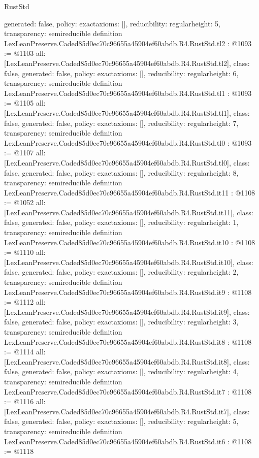 \begin{lexlean}{RustStd}
\begin{coremodule}
{  generated: false,
  policy: exact{axioms: []},
  reducibility: regular{height: 5},
  transparency: semireducible
}
definition LexLeanPreserve.Caded85d0ec70c96655a45904ef60abdb.R4.RustStd.tl2 : @1093 := @1103 {
  all: [LexLeanPreserve.Caded85d0ec70c96655a45904ef60abdb.R4.RustStd.tl2],
  class: false,
  generated: false,
  policy: exact{axioms: []},
  reducibility: regular{height: 6},
  transparency: semireducible
}
definition LexLeanPreserve.Caded85d0ec70c96655a45904ef60abdb.R4.RustStd.tl1 : @1093 := @1105 {
  all: [LexLeanPreserve.Caded85d0ec70c96655a45904ef60abdb.R4.RustStd.tl1],
  class: false,
  generated: false,
  policy: exact{axioms: []},
  reducibility: regular{height: 7},
  transparency: semireducible
}
definition LexLeanPreserve.Caded85d0ec70c96655a45904ef60abdb.R4.RustStd.tl0 : @1093 := @1107 {
  all: [LexLeanPreserve.Caded85d0ec70c96655a45904ef60abdb.R4.RustStd.tl0],
  class: false,
  generated: false,
  policy: exact{axioms: []},
  reducibility: regular{height: 8},
  transparency: semireducible
}
definition LexLeanPreserve.Caded85d0ec70c96655a45904ef60abdb.R4.RustStd.it11 : @1108 := @1052 {
  all: [LexLeanPreserve.Caded85d0ec70c96655a45904ef60abdb.R4.RustStd.it11],
  class: false,
  generated: false,
  policy: exact{axioms: []},
  reducibility: regular{height: 1},
  transparency: semireducible
}
definition LexLeanPreserve.Caded85d0ec70c96655a45904ef60abdb.R4.RustStd.it10 : @1108 := @1110 {
  all: [LexLeanPreserve.Caded85d0ec70c96655a45904ef60abdb.R4.RustStd.it10],
  class: false,
  generated: false,
  policy: exact{axioms: []},
  reducibility: regular{height: 2},
  transparency: semireducible
}
definition LexLeanPreserve.Caded85d0ec70c96655a45904ef60abdb.R4.RustStd.it9 : @1108 := @1112 {
  all: [LexLeanPreserve.Caded85d0ec70c96655a45904ef60abdb.R4.RustStd.it9],
  class: false,
  generated: false,
  policy: exact{axioms: []},
  reducibility: regular{height: 3},
  transparency: semireducible
}
definition LexLeanPreserve.Caded85d0ec70c96655a45904ef60abdb.R4.RustStd.it8 : @1108 := @1114 {
  all: [LexLeanPreserve.Caded85d0ec70c96655a45904ef60abdb.R4.RustStd.it8],
  class: false,
  generated: false,
  policy: exact{axioms: []},
  reducibility: regular{height: 4},
  transparency: semireducible
}
definition LexLeanPreserve.Caded85d0ec70c96655a45904ef60abdb.R4.RustStd.it7 : @1108 := @1116 {
  all: [LexLeanPreserve.Caded85d0ec70c96655a45904ef60abdb.R4.RustStd.it7],
  class: false,
  generated: false,
  policy: exact{axioms: []},
  reducibility: regular{height: 5},
  transparency: semireducible
}
definition LexLeanPreserve.Caded85d0ec70c96655a45904ef60abdb.R4.RustStd.it6 : @1108 := @1118 {
}
\end{coremodule}
\end{lexlean}
